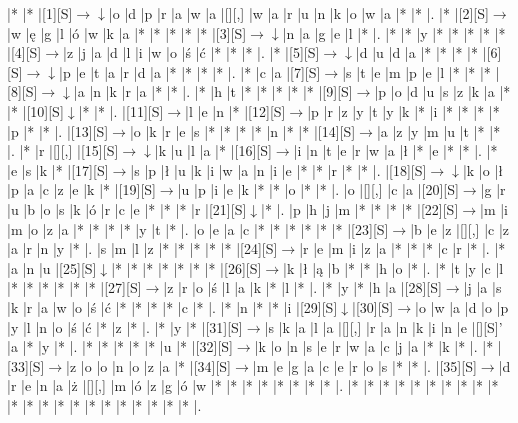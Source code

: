 \documentclass[11pt]{article}
\newcommand\drarr{$\rightarrow \!\!\!\!\! \downarrow$}
\newcommand\rarr{$\rightarrow$}
\newcommand\darr{$\downarrow$}
\begin{document}
\noindent\begin{Puzzle}{21}{23}|*	|*	|[1][S]\drarr	|o	|d	|p	|r	|a	|w	|a	|[][,]{ }	|w	|a	|r	|u	|n	|k	|o	|w	|a	|*	|*	|.
|*	|[2][S]\rarr	|w	|ę	|g	|l	|ó	|w	|k	|a	|*	|*	|*	|*	|*	|[3][S]\drarr	|n	|a	|g	|e	|l	|*	|.
|*	|*	|y	|*	|*	|*	|*	|*	|[4][S]\rarr	|z	|j	|a	|d	|l	|i	|w	|o	|ś	|ć	|*	|*	|*	|.
|*	|[5][S]\drarr	|d	|u	|d	|a	|*	|*	|*	|*	|[6][S]\drarr	|p	|e	|t	|a	|r	|d	|a	|*	|*	|*	|*	|.
|*	|c	|a	|[7][S]\rarr	|s	|t	|e	|m	|p	|e	|l	|*	|*	|*	|[8][S]\drarr	|a	|n	|k	|r	|a	|*	|*	|.
|*	|h	|t	|*	|*	|*	|*	|*	|[9][S]\rarr	|p	|o	|d	|u	|s	|z	|k	|a	|*	|*	|[10][S]\darr	|*	|*	|.
|[11][S]\rarr	|l	|e	|n	|*	|[12][S]\rarr	|p	|r	|z	|y	|t	|y	|k	|*	|i	|*	|*	|*	|*	|p	|*	|*	|.
|[13][S]\rarr	|o	|k	|r	|e	|s	|*	|*	|*	|*	|n	|*	|*	|[14][S]\rarr	|a	|z	|y	|m	|u	|t	|*	|*	|.
|*	|r	|[][,]{ }	|[15][S]\drarr	|k	|u	|l	|a	|*	|[16][S]\rarr	|i	|n	|t	|e	|r	|w	|a	|ł	|*	|e	|*	|*	|.
|*	|e	|s	|k	|*	|[17][S]\rarr	|s	|p	|ł	|u	|k	|i	|w	|a	|n	|i	|e	|*	|*	|r	|*	|*	|.
|[18][S]\drarr	|k	|o	|ł	|p	|a	|c	|z	|e	|k	|*	|[19][S]\rarr	|u	|p	|i	|e	|k	|*	|*	|o	|*	|*	|.
|o	|[][,]{ }	|c	|a	|[20][S]\rarr	|g	|r	|u	|b	|o	|s	|k	|ó	|r	|c	|e	|*	|*	|*	|r	|[21][S]\darr	|*	|.
|p	|h	|j	|m	|*	|*	|*	|*	|[22][S]\rarr	|m	|i	|m	|o	|z	|a	|*	|*	|*	|*	|y	|t	|*	|.
|o	|e	|a	|c	|*	|*	|*	|*	|*	|*	|[23][S]\rarr	|b	|e	|z	|[][,]{ }	|c	|z	|a	|r	|n	|y	|*	|.
|s	|m	|l	|z	|*	|*	|*	|*	|*	|[24][S]\rarr	|r	|e	|m	|i	|z	|a	|*	|*	|*	|c	|r	|*	|.
|*	|a	|n	|u	|[25][S]\darr	|*	|*	|*	|*	|*	|*	|*	|[26][S]\rarr	|k	|ł	|ą	|b	|*	|*	|h	|o	|*	|.
|*	|t	|y	|c	|l	|*	|*	|*	|*	|*	|*	|[27][S]\rarr	|z	|r	|o	|ś	|l	|a	|k	|*	|l	|*	|.
|*	|y	|*	|h	|a	|[28][S]\rarr	|j	|a	|s	|k	|r	|a	|w	|o	|ś	|ć	|*	|*	|*	|*	|c	|*	|.
|*	|n	|*	|*	|i	|[29][S]\darr	|[30][S]\rarr	|o	|w	|a	|d	|o	|p	|y	|l	|n	|o	|ś	|ć	|*	|z	|*	|.
|*	|y	|*	|[31][S]\rarr	|s	|k	|a	|l	|a	|[][,]{ }	|r	|a	|n	|k	|i	|n	|e	|[][S]'	|a	|*	|y	|*	|.
|*	|*	|*	|*	|*	|u	|*	|[32][S]\rarr	|k	|o	|n	|s	|e	|r	|w	|a	|c	|j	|a	|*	|k	|*	|.
|*	|[33][S]\rarr	|z	|o	|o	|n	|o	|z	|a	|*	|[34][S]\rarr	|m	|e	|g	|a	|c	|e	|r	|o	|s	|*	|*	|.
|[35][S]\rarr	|d	|r	|e	|n	|a	|ż	|[][,]{ }	|m	|ó	|z	|g	|ó	|w	|*	|*	|*	|*	|*	|*	|*	|*	|.
|*	|*	|*	|*	|*	|*	|*	|*	|*	|*	|*	|*	|*	|*	|*	|*	|*	|*	|*	|*	|*	|*	|.\end{Puzzle}

\newpage
\end{document}
